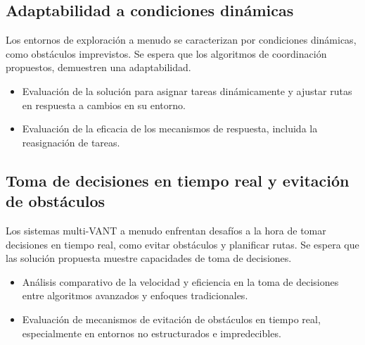 \documentclass[sigconf]{acmart}
\begin{document}
\subsection*{Adaptabilidad a condiciones dinámicas}

Los entornos de exploración a menudo se caracterizan por condiciones dinámicas, como obstáculos imprevistos. Se espera que los algoritmos de coordinación propuestos, demuestren una adaptabilidad.

\begin{itemize}
\item Evaluación de la solución para asignar tareas dinámicamente y ajustar rutas en respuesta a cambios en su entorno.
\item Evaluación de la eficacia de los mecanismos de respuesta, incluida la reasignación de tareas.
\end{itemize}

\subsection*{Toma de decisiones en tiempo real y evitación de obstáculos}

Los sistemas multi-VANT a menudo enfrentan desafíos a la hora de tomar decisiones en tiempo real, como evitar obstáculos y planificar rutas. Se espera que las solución propuesta muestre capacidades de toma de decisiones.

\begin{itemize}
\item Análisis comparativo de la velocidad y eficiencia en la toma de decisiones entre algoritmos avanzados y enfoques tradicionales.
\item Evaluación de mecanismos de evitación de obstáculos en tiempo real, especialmente en entornos no estructurados e impredecibles.
\end{itemize}



\end{document}
